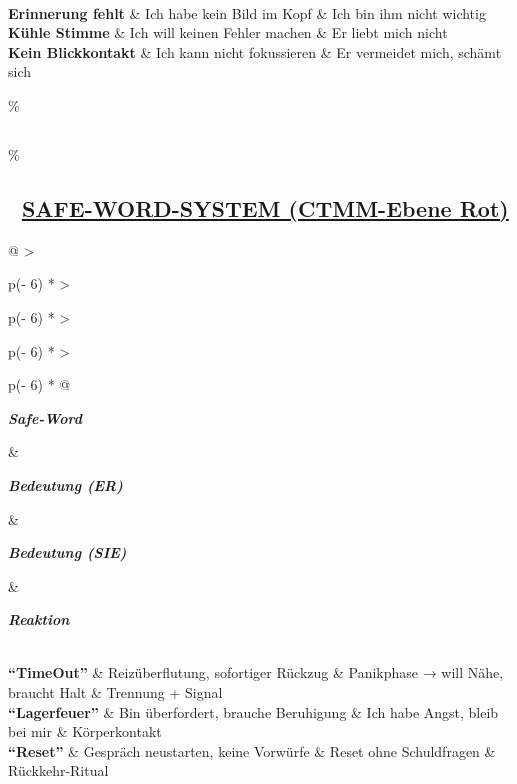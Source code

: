 \begin{longtable}[]
\\
\textbf{Erinnerung fehlt} \& Ich habe kein Bild im Kopf \& Ich bin ihm nicht wichtig \\
\textbf{Kühle Stimme} \& Ich will keinen Fehler machen \& Er liebt mich nicht \\
\textbf{Kein Blickkontakt} \& Ich kann nicht fokussieren \& Er vermeidet mich, schämt sich \\
\end{longtable}

\hypertarget{section-1}{\%
\subsection{}\label{section-1}}

\hypertarget{safe-word-system-ctmm-ebene-rot}{\%
\subsection{\texorpdfstring{🔑 \textbf{\ul{SAFE-WORD-SYSTEM (CTMM-Ebene Rot)}}}{🔑 SAFE-WORD-SYSTEM (CTMM-Ebene Rot)}}\label{safe-word-system-ctmm-ebene-rot}}

\begin{longtable}[]{@{}
  >{\raggedright\arraybackslash}p{(\columnwidth - 6\tabcolsep) * }
  >{\raggedright\arraybackslash}p{(\columnwidth - 6\tabcolsep) * }
  >{\raggedright\arraybackslash}p{(\columnwidth - 6\tabcolsep) * }
  >{\raggedright\arraybackslash}p{(\columnwidth - 6\tabcolsep) * }@{}}
\toprule\noalign{}
\begin{minipage}[b]{\linewidth}\raggedright
\emph{\textbf{Safe-Word}}
\end{minipage} \& \begin{minipage}[b]{\linewidth}\raggedright
\emph{\textbf{Bedeutung (ER)}}
\end{minipage} \& \begin{minipage}[b]{\linewidth}\raggedright
\emph{\textbf{Bedeutung (SIE)}}
\end{minipage} \& \begin{minipage}[b]{\linewidth}\raggedright
\emph{\textbf{Reaktion}}
\end{minipage} \\
\midrule\noalign{}
\endhead
\bottomrule\noalign{}
\endlastfoot
\textbf{``TimeOut''} \& Reizüberflutung, sofortiger Rückzug \& Panikphase → will Nähe, braucht Halt \& Trennung + Signal \\
\textbf{``Lagerfeuer''} \& Bin überfordert, brauche Beruhigung \& Ich habe Angst, bleib bei mir \& Körperkontakt \\
\textbf{``Reset''} \& Gespräch neustarten, keine Vorwürfe \& Reset ohne Schuldfragen \& Rückkehr-Ritual \\
\end{longtable}

